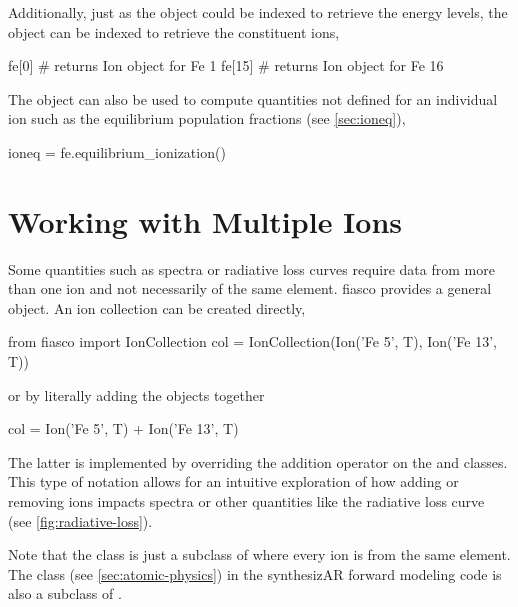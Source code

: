 Additionally, just as the  object could be indexed to retrieve the energy levels, the  object can be indexed to retrieve the constituent ions,
\begin{pyverbatim}[appendix1][baselinestretch=1,xleftmargin=3em]
fe[0] # returns Ion object for Fe 1
fe[15] # returns Ion object for Fe 16
\end{pyverbatim}

The  object can also be used to compute quantities not defined for an individual ion such as the equilibrium population fractions (see \autoref{sec:ioneq}),
\begin{pyverbatim}[appendix1][baselinestretch=1,xleftmargin=3em]
ioneq = fe.equilibrium_ionization()
\end{pyverbatim}

\section{Working with Multiple Ions}\label{sec:ion-collection}

Some quantities such as spectra or radiative loss curves require data from more than one ion and not necessarily of the same element. fiasco provides a general  object. An ion collection can be created directly,
\begin{pyverbatim}[appendix1][baselinestretch=1,xleftmargin=3em]
from fiasco import IonCollection
col = IonCollection(Ion('Fe 5', T), Ion('Fe 13', T))
\end{pyverbatim}
or by literally adding the objects together
\begin{pyverbatim}[appendix1][baselinestretch=1,xleftmargin=3em]
col = Ion('Fe 5', T) + Ion('Fe 13', T)
\end{pyverbatim}
The latter is implemented by overriding the addition operator on the  and  classes. This type of notation allows for an intuitive exploration of how adding or removing ions impacts spectra or other quantities like the radiative loss curve (see \autoref{fig:radiative-loss}).

Note that the  class is just a subclass of  where every ion is from the same element. The  class (see \autoref{sec:atomic-physics}) in the synthesizAR forward modeling code is also a subclass of .
